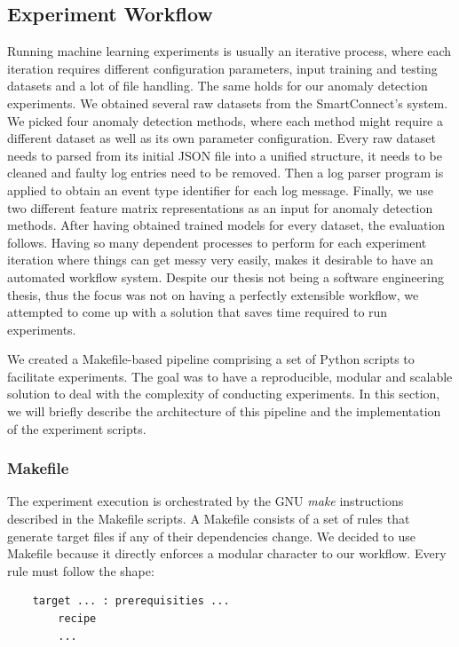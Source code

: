 \subsection{Experiment Workflow}
Running machine learning experiments is usually an iterative process, where each iteration requires different configuration parameters, input training and testing datasets and a lot of file handling. The same holds for our anomaly detection experiments. We obtained several raw datasets from the SmartConnect's system. We picked four anomaly detection methods, where each method might require a different dataset as well as its own parameter configuration. Every raw dataset needs to parsed from its initial JSON file into a unified structure, it needs to be cleaned and faulty log entries need to be removed. Then a log parser program is applied to obtain an event type identifier for each log message. Finally, we use two different feature matrix representations as an input for anomaly detection methods. After having obtained trained models for every dataset, the evaluation follows. Having so many dependent processes to perform for each experiment iteration where things can get messy very easily, makes it desirable to have an automated workflow system. Despite our thesis not being a software engineering thesis, thus the focus was not on having a perfectly extensible workflow, we attempted to come up with a solution that saves time required to run experiments.

We created a Makefile-based pipeline comprising a set of Python scripts to facilitate experiments. The goal was to have a reproducible, modular and scalable solution to deal with the complexity of conducting experiments. In this section, we will briefly describe the architecture of this pipeline and the implementation of the experiment scripts.
 
 \subsubsection*{Makefile}
The experiment execution is orchestrated by the GNU \textit{make} instructions described in the Makefile scripts. A Makefile consists of a set of rules that generate target files if any of their dependencies change. We decided to use Makefile because it directly enforces a modular character to our workflow. Every rule must follow the shape:

\begin{verbatim}
    target ... : prerequisities ... 
        recipe
        ...
\end{verbatim}

